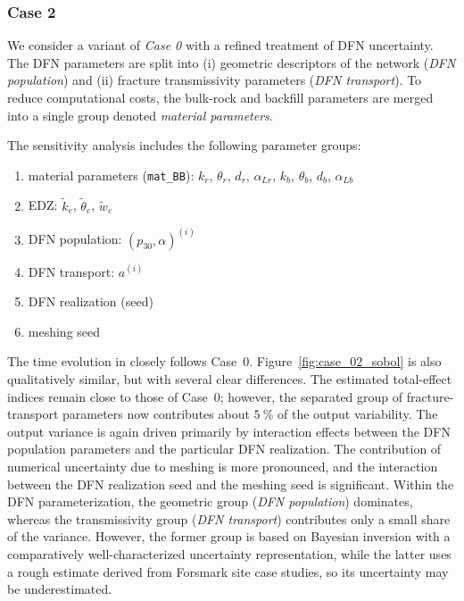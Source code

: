 \FloatBarrier
\subsubsection{Case 2}
We consider a variant of \emph{Case 0} with a refined treatment of DFN
uncertainty. The DFN parameters are split into (i) geometric descriptors of the
network (\emph{DFN population}) and (ii) fracture transmissivity parameters
(\emph{DFN transport}). To reduce computational costs, the bulk-rock and
backfill parameters are merged into a single group denoted
\emph{material parameters}.

The sensitivity analysis includes the following parameter groups:
\begin{enumerate}
    \item material parameters (\verb|mat_BB|): $k_r$, $\theta_r$, $d_r$,
    $\alpha_{Lr}$, $k_b$, $\theta_b$, $d_b$, $\alpha_{Lb}$
    \item EDZ: $\tilde k_e$, $\tilde \theta_e$, $\tilde w_e$
    \item DFN population: $(p_{30}, \alpha)^{(i)}$
    \item DFN transport: $a^{(i)}$
    \item DFN realization (seed)
    \item meshing seed
\end{enumerate}

The time evolution in  closely follows Case~0.
Figure~\ref{fig:case_02_sobol} is also qualitatively similar, but with several
clear differences.
The estimated total-effect indices remain close to those of Case~0; however,
the separated group of fracture-transport parameters now contributes about
$5~\%$ of the output variability.
The output variance is again driven primarily by interaction effects between the
DFN population parameters and the particular DFN realization.
The contribution of numerical uncertainty due to meshing is more pronounced,
and the interaction between the DFN realization seed and the meshing seed is
significant.
Within the DFN parameterization, the geometric group (\emph{DFN population})
dominates, whereas the transmissivity group (\emph{DFN transport}) contributes
only a small share of the variance. However, the former group is based on
Bayesian inversion with a comparatively well-characterized uncertainty
representation, while the latter uses a rough estimate derived from Forsmark
site case studies, so its uncertainty may be underestimated.

